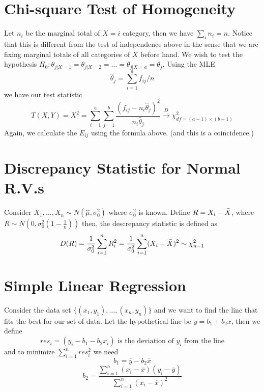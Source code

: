 \documentclass{article}
\begin{document}
\section{Chi-square Test of Homogeneity}
Let $n_i$ be the marginal total of $X=i$ category, then we have $\sum_i n_i = n$. Notice that this is different
from the test of independence above in the sense that we are fixing marginal totals of all categories of $X$ before hand.
We wish to test the hypothesis $H_0: \theta_{j|X=1} = \theta_{j|X=2} =\ldots= \theta_{j|X=a} = \theta_j$. Using the MLE
\begin{equation*}
    \hat{\theta}_j = \sum_{i=1}^a f_{ij}/n
\end{equation*}
we have our test statistic
\begin{equation*}
    T(X,Y) = X^2 = \sum_{i=1}^a\sum_{j=1}^b \frac{\left(f_{ij} - n_i\hat{\theta}_{j}\right)^2}{n_i\hat{\theta}_{j}} \xrightarrow{D} \chi^2_{df=(a-1)\times(b-1)}
\end{equation*}
Again, we calculate the $E_{ij}$ using the formula above. (and this is a coincidence.)


\section{Discrepancy Statistic for Normal R.V.s}
Consider $X_1,\ldots,X_n\sim N(\hat{\mu}, \sigma_0^2)$ where $\sigma_0^2$ is known. Define $R = X_i - \Bar{X}$, where $R\sim N(0, \sigma_0^2 (1 - \frac{1}{n}))$ then, the descrepancy statistic is defined as
\begin{equation*}
    D(R) = \frac{1}{\sigma_0^2}\sum_{i = 1}^n R_i^2 =  \frac{1}{\sigma_0^2}\sum_{i=1}^n(X_i - \Bar{X})^2 \sim \chi^2_{n-1}
\end{equation*}

\section{Simple Linear Regression}
Consider the data set $\{ (x_1,y_1),\ldots,(x_n,y_n) \}$ and we want to find the line that
fits the best for our set of data. Let the hypothetical line be $y = b_1 + b_2 x$, then we define
\begin{equation*}
    res_i = (y_i - b_1-b_2x_i)\,\,\text{is the deviation of $y_i$ from the line}
\end{equation*}
and to minimize $\sum_{i=1}^nres_i^2$ we need
\begin{equation*}
    b_1 = \overline{y} - b_2\overline{x}
\end{equation*}
\begin{equation*}
    b_2 = \frac{\sum_{i=1}^n(x_i - \overline{x})(y_i-\overline{y})}{\sum_{i=1}^n\left(x_i-\overline{x}\right)^2}
\end{equation*}
\end{document}
